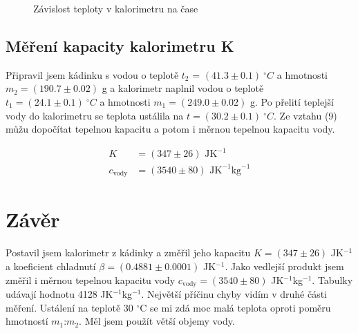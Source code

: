\documentclass[a4paper,11pt]{article}
\begin{document}
\begin{figure}[htpb]
  \centering
  
  \caption{Závislost teploty v kalorimetru na čase}
\end{figure}

\subsection{Měření kapacity kalorimetru K}

Připravil jsem kádinku s vodou o teplotě $t_2$ = $ (41.3 \pm 0.1)\ ^{\circ}C$ a hmotnosti $m_2 = (190.7 \pm 0.02)$ g a kalorimetr naplnil vodou o teplotě $t_1 = (24.1 \pm 0.1)\ ^{\circ}C$ a hmotnosti $m_1 = (249.0 \pm 0.02)$ g. Po přelití teplejší vody do kalorimetru se teplota ustálila na $t=(30.2 \pm 0.1)\ ^{\circ}C$. Ze vztahu (9) můžu dopočítat tepelnou kapacitu a potom i měrnou tepelnou kapacitu vody.

\begin{align}
  K &= (347 \pm 26) \text{ JK}^{-1} \\
  c_{\text{vody}} &=  (3540 \pm 80) \text{ JK}^{-1}\text{kg}^{-1}
\end{align}

\section{Závěr}

Postavil jsem kalorimetr z kádinky a změřil jeho kapacitu $K = (347 \pm 26)$ JK$^{-1}$ a koeficient chladnutí $\beta = (0.4881 \pm 0.0001)$ JK$^{-1}$. Jako vedlejší produkt jsem změřil i měrnou tepelnou kapacitu vody $c_{\text{vody}} = (3540 \pm 80)$ JK$^{-1}$kg$^{-1}$. Tabulky udávají hodnotu 4128 JK$^{-1}$kg$^{-1}$. Největší příčinu chyby vidím v druhé části měření. Ustálení na teplotě 30 $^{\circ}$C se mi zdá moc malá teplota oproti poměru hmotností $m_1$:$m_2$. Měl jsem použít větší objemy vody.
\end{document}
